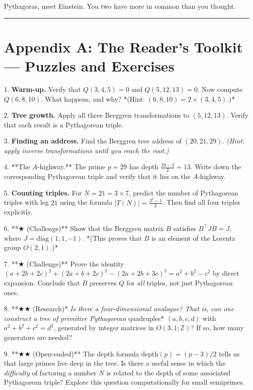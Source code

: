 \documentclass[12pt, letterpaper, openany]{book}
\theoremstyle{definition}
\theoremstyle{remark}
\begin{document}
Pythagoras, meet Einstein. You two have more in common than you thought.


\bigskip\noindent\rule{\textwidth}{0.4pt}\bigskip



\section*{Appendix A: The Reader's Toolkit --- Puzzles and Exercises}


1. \textbf{Warm-up.} Verify that $Q(3, 4, 5) = 0$ and $Q(5, 12, 13) = 0$. Now compute $Q(6, 8, 10)$. What happens, and why? *(Hint: $(6, 8, 10) = 2 \times (3, 4, 5)$.)*

2. \textbf{Tree growth.} Apply all three Berggren transformations to $(5, 12, 13)$. Verify that each result is a Pythagorean triple.

3. \textbf{Finding an address.} Find the Berggren tree address of $(20, 21, 29)$. \textit{(Hint: apply inverse transformations until you reach the root.)}

4. **The $A$-highway.** The prime $p = 29$ has depth $\frac{29 - 3}{2} = 13$. Write down the corresponding Pythagorean triple and verify that it lies on the $A$-highway.

5. \textbf{Counting triples.} For $N = 21 = 3 \times 7$, predict the number of Pythagorean triples with leg $21$ using the formula $|T(N)| = \frac{3^k - 1}{2}$. Then find all four triples explicitly.

6. **{$\bigstar$} (Challenge)** Show that the Berggren matrix $B$ satisfies $B^\top J B = J$, where $J = \text{diag}(1, 1, -1)$. *(This proves that $B$ is an element of the Lorentz group $O(2,1)$.)*

7. **{$\bigstar$} (Challenge)** Prove the identity $(a + 2b + 2c)^2 + (2a + b + 2c)^2 - (2a + 2b + 3c)^2 = a^2 + b^2 - c^2$ by direct expansion. Conclude that $B$ preserves $Q$ for \textit{all} triples, not just Pythagorean ones.

8. **{$\bigstar$}{$\bigstar$} (Research)*\textit{ Is there a four-dimensional analogue? That is, can one construct a tree of primitive Pythagorean }quadruples* $(a, b, c, d)$ with $a^2 + b^2 + c^2 = d^2$, generated by integer matrices in $O(3,1; \mathbb{Z})$? If so, how many generators are needed?

9. **{$\bigstar$}{$\bigstar$} (Open-ended)** The depth formula $\text{depth}(p) = (p-3)/2$ tells us that large primes live deep in the tree. Is there a useful sense in which the \textit{difficulty} of factoring a number $N$ is related to the depth of some associated Pythagorean triple? Explore this question computationally for small semiprimes.
\end{document}
